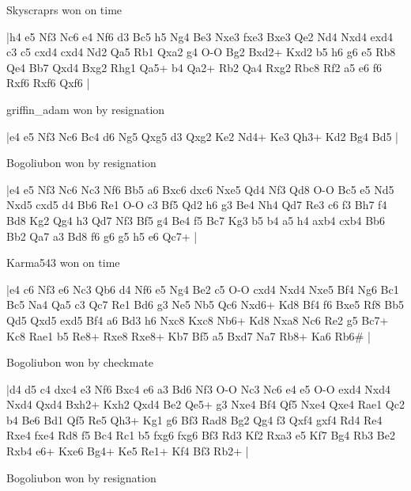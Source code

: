\showboard

Skyscraprs won on time

\makegametitle
|h4 e5 Nf3 Nc6 e4 Nf6 d3 Bc5 h5 Ng4 Be3 Nxe3 fxe3 Bxe3 Qe2 Nd4 Nxd4 exd4 c3 c5 cxd4 cxd4 Nd2 Qa5 Rb1 Qxa2 g4 O-O Bg2 Bxd2+ Kxd2 b5 h6 g6 e5 Rb8 Qe4 Bb7 Qxd4 Bxg2 Rhg1 Qa5+ b4 Qa2+ Rb2 Qa4 Rxg2 Rbc8 Rf2 a5 e6 f6 Rxf6 Rxf6 Qxf6  |

\showboard

griffin\_adam won by resignation

\makegametitle
|e4 e5 Nf3 Nc6 Bc4 d6 Ng5 Qxg5 d3 Qxg2 Ke2 Nd4+ Ke3 Qh3+ Kd2 Bg4 Bd5  |

\showboard

Bogoliubon won by resignation

\makegametitle
|e4 e5 Nf3 Nc6 Nc3 Nf6 Bb5 a6 Bxc6 dxc6 Nxe5 Qd4 Nf3 Qd8 O-O Bc5 e5 Nd5 Nxd5 cxd5 d4 Bb6 Re1 O-O c3 Bf5 Qd2 h6 g3 Be4 Nh4 Qd7 Re3 c6 f3 Bh7 f4 Bd8 Kg2 Qg4 h3 Qd7 Nf3 Bf5 g4 Be4 f5 Bc7 Kg3 b5 b4 a5 h4 axb4 cxb4 Bb6 Bb2 Qa7 a3 Bd8 f6 g6 g5 h5 e6 Qc7+  |

\showboard

Karma543 won on time

\makegametitle
|e4 c6 Nf3 e6 Nc3 Qb6 d4 Nf6 e5 Ng4 Be2 c5 O-O cxd4 Nxd4 Nxe5 Bf4 Ng6 Bc1 Bc5 Na4 Qa5 c3 Qc7 Re1 Bd6 g3 Ne5 Nb5 Qc6 Nxd6+ Kd8 Bf4 f6 Bxe5 Rf8 Bb5 Qd5 Qxd5 exd5 Bf4 a6 Bd3 h6 Nxc8 Kxc8 Nb6+ Kd8 Nxa8 Nc6 Re2 g5 Bc7+ Kc8 Rae1 b5 Re8+ Rxe8 Rxe8+ Kb7 Bf5 a5 Bxd7 Na7 Rb8+ Ka6 Rb6\#  |

\showboard

Bogoliubon won by checkmate

\makegametitle
|d4 d5 c4 dxc4 e3 Nf6 Bxc4 e6 a3 Bd6 Nf3 O-O Nc3 Nc6 e4 e5 O-O exd4 Nxd4 Nxd4 Qxd4 Bxh2+ Kxh2 Qxd4 Be2 Qe5+ g3 Nxe4 Bf4 Qf5 Nxe4 Qxe4 Rae1 Qc2 b4 Be6 Bd1 Qf5 Re5 Qh3+ Kg1 g6 Bf3 Rad8 Bg2 Qg4 f3 Qxf4 gxf4 Rd4 Re4 Rxe4 fxe4 Rd8 f5 Bc4 Rc1 b5 fxg6 fxg6 Bf3 Rd3 Kf2 Rxa3 e5 Kf7 Bg4 Rb3 Be2 Rxb4 e6+ Kxe6 Bg4+ Ke5 Re1+ Kf4 Bf3 Rb2+  |

\showboard

Bogoliubon won by resignation

